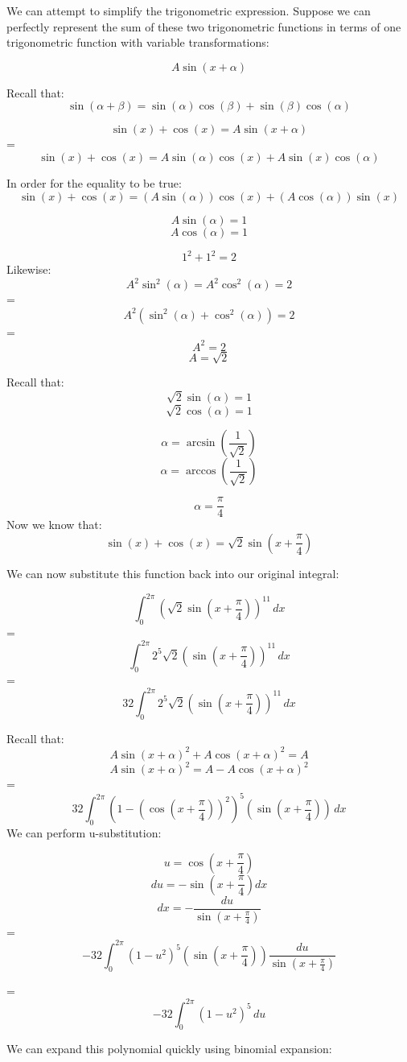 \documentclass{article}
\begin{document}
\noindent We can attempt to simplify the trigonometric expression. Suppose we can perfectly represent the sum of these two trigonometric functions in terms of one trigonometric function with variable transformations:
\begin{flushleft}
\[A\sin(x+\alpha)\]

\noindent Recall that:
\[\sin(\alpha+\beta) = \sin(\alpha)\cos(\beta) + \sin(\beta)\cos(\alpha)\]

\[\sin(x) + \cos(x) = A\sin(x+\alpha)\]
=\[\sin(x) + \cos(x) = A\sin(\alpha)\cos(x) + A\sin(x)\cos(\alpha) \]

\noindent In order for the equality to be true:
\[\sin(x) + \cos(x) = (A\sin(\alpha))\cos(x) + (A\cos(\alpha))\sin(x) \]

\[A\sin(\alpha) = 1 \]
\[A\cos(\alpha) = 1\]

\[1^2 + 1^2 = 2\]
\noindent Likewise:
\[A^2\sin^2(\alpha) = A^2\cos^2(\alpha) = 2\]
=\[A^2(\sin^2(\alpha) + \cos^2(\alpha)) = 2\]
=\[A^2 = 2\]
\[A = \sqrt{2}\]

\noindent Recall that:
\[\sqrt{2}\sin(\alpha) = 1 \]
\[\sqrt{2}\cos(\alpha) = 1\]

\[\alpha = \arcsin(\frac{1}{\sqrt{2}})\]
\[\alpha = \arccos(\frac{1}{\sqrt{2}})\]

\[\alpha = \frac{\pi}{4}\]
Now we know that:
\[\sin(x) + \cos(x) = \sqrt{2}\sin(x + \frac{\pi}{4})\]

\noindent We can now substitute this function back into our original integral:

\[\int_{0}^{2\pi} (\sqrt{2}\sin(x + \frac{\pi}{4}))^{11} \,dx \]
=\[\int_{0}^{2\pi} 2^{5}\sqrt{2}\left(\sin\left(x+\frac{\pi}{4}\right)\right)^{11}\,dx\]
=\[32\int_{0}^{2\pi} 2^{5}\sqrt{2}\left(\sin\left(x+\frac{\pi}{4}\right)\right)^{11}\,dx\]

\noindent Recall that:
\[A\sin(x+\alpha)^2 + A\cos(x+\alpha)^2 = A\]
\[A\sin(x+\alpha)^2 = A - A\cos(x+\alpha)^2\]
=\[32\int_{0}^{2\pi} \left(1-\left(\cos\left(x+\frac{\pi}{4}\right)\right)^{2}\right)^{5}\left(\sin\left(x+\frac{\pi}{4}\right)\right)\,dx\]
We can perform u-substitution:

\[u=\cos\left(x+\frac{\pi}{4}\right)\]
\[du=-\sin\left(x +\frac{\pi}{4}\right)dx\]
\[dx = -\frac{du}{\sin(x +\frac{\pi}{4})} \]
= \[-32\int_{0}^{2\pi} \left(1-u^{2}\right)^{5}\left(\sin\left(x+\frac{\pi}{4}\right)\right) \frac{du}{\sin(x +\frac{\pi}{4})} \]

= \[-32\int_{0}^{2\pi} (1-u^{2})^5\,du\]

\noindent We can expand this polynomial quickly using binomial expansion:


\end{flushleft}
\end{document}
